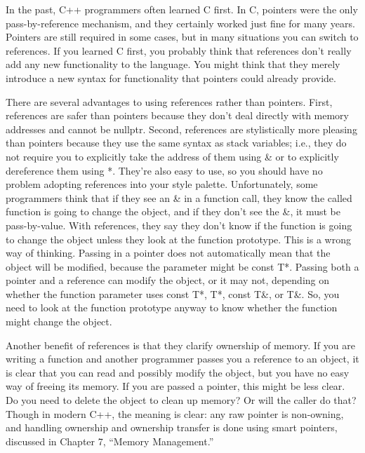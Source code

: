 
In the past, C++ programmers often learned C first. In C, pointers were the only pass-by-reference mechanism, and they certainly worked just fine for many years. Pointers are still required in some cases, but in many situations you can switch to references. If you learned C first, you probably think that references don’t really add any new functionality to the language. You might think that they merely introduce a new syntax for functionality that pointers could already provide.

There are several advantages to using references rather than pointers. First, references are safer than pointers because they don’t deal directly with memory addresses and cannot be nullptr. Second, references are stylistically more pleasing than pointers because they use the same syntax as stack variables; i.e., they do not require you to explicitly take the address of them using \& or to explicitly dereference them using *. They’re also easy to use, so you should have no problem adopting references into your style palette. Unfortunately, some programmers think that if they see an \& in a function call, they know the called function is going to change the object, and if they don’t see the \&, it must be pass-by-value. With references, they say they don’t know if the function is going to change the object unless they look at the function prototype. This is a wrong way of thinking. Passing in a pointer does not automatically mean that the object will be modified, because the parameter might be const T*. Passing both a pointer and a reference can modify the object, or it may not, depending on whether the function parameter uses const T*, T*, const T\&, or T\&. So, you need to look at the function prototype anyway to know whether the function might change the object.

Another benefit of references is that they clarify ownership of memory. If you are writing a function and another programmer passes you a reference to an object, it is clear that you can read and possibly modify the object, but you have no easy way of freeing its memory. If you are passed a pointer, this might be less clear. Do you need to delete the object to clean up memory? Or will the caller do that? Though in modern C++, the meaning is clear: any raw pointer is non-owning, and handling ownership and ownership transfer is done using smart pointers, discussed in Chapter 7, “Memory Management.”


